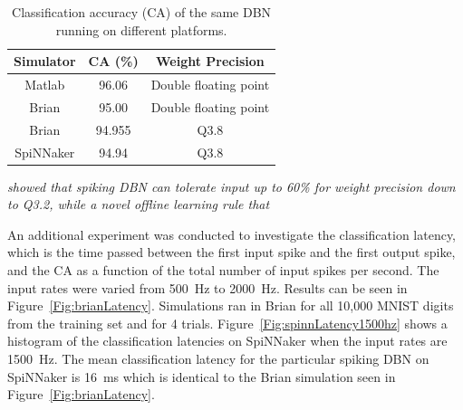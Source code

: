 \begin{table}[h]
\caption{Classification accuracy (CA) of the same DBN running on different platforms.}
\begin{center}
\begin{tabular} {c|c|c}
	Simulator & CA (\%) & Weight Precision \\
    \hline
    Matlab & 96.06 & Double floating point\\
    Brian & 95.00 & Double floating point\\
    Brian & 94.955 & Q3.8\\
    SpiNNaker & 94.94 & Q3.8\\
\end{tabular}
\label{tab:casimulators}
\end{center}
\end{table}


\citet{} \textit{showed that spiking DBN can tolerate input 
up to 60\% for weight precision down to Q3.2, while a novel offline learning rule that }


An additional experiment was conducted to investigate the classification latency, which is the time passed between the first input spike and the first output spike, and the CA as a function of the total number of input spikes per second. The input rates were varied from 500~Hz to 2000~Hz. Results can be seen in Figure~\ref{Fig:brianLatency}. Simulations ran in Brian for all 10,000 MNIST digits from the training set and for 4 trials. Figure~\ref{Fig:spinnLatency1500hz} shows a histogram of the classification latencies on SpiNNaker when the input rates are 1500~Hz. The mean classification latency for the particular spiking DBN on SpiNNaker is 16~ms which is identical to the Brian simulation seen in Figure~\ref{Fig:brianLatency}.


